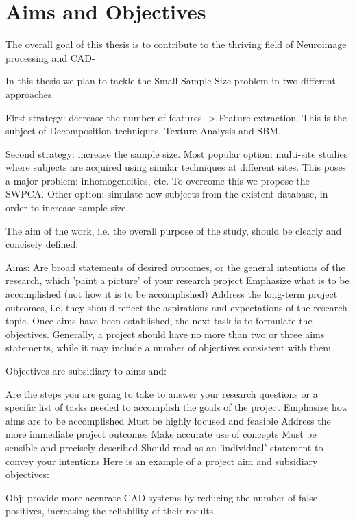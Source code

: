 \section{Aims and Objectives}\label{sec:overview}
The overall goal of this thesis is to contribute to the thriving field of Neuroimage processing and \ac{CAD}-  

In this thesis we plan to tackle the Small Sample Size problem in two different approaches. 


First strategy: decrease the number of features -> Feature extraction. This is the subject of Decomposition techniques, Texture Analysis and \ac{SBM}. 

Second strategy: increase the sample size. Most popular option: multi-site studies where subjects are acquired using similar techniques at different sites. This poses a major problem: inhomogeneities, etc. To overcome this we propose the \ac{SWPCA}. Other option: simulate new subjects from the existent database, in order to increase sample size.



The aim of the work, i.e. the overall purpose of the study, should be clearly and concisely defined.

Aims:
Are broad statements of desired outcomes, or the general intentions of the research, which 'paint a picture' of your research project
Emphasize what is to be accomplished (not how it is to be accomplished)
Address the long-term project outcomes, i.e. they should reflect the aspirations and expectations of the research topic.
Once aims have been established, the next task is to formulate the objectives. Generally, a project should have no more than two or three aims statements, while it may include a number of objectives consistent with them.

Objectives are subsidiary to aims and:

Are the steps you are going to take to answer your research questions or a specific list of tasks needed to accomplish the goals of the project
Emphasize how aims are to be accomplished
Must be highly focused and feasible
Address the more immediate project outcomes
Make accurate use of concepts
Must be sensible and precisely described
Should read as an 'individual' statement to convey your intentions
Here is an example of a project aim and subsidiary objectives:


Obj: provide more accurate CAD systems by reducing the number of false positives, increasing the reliability of their results. 


